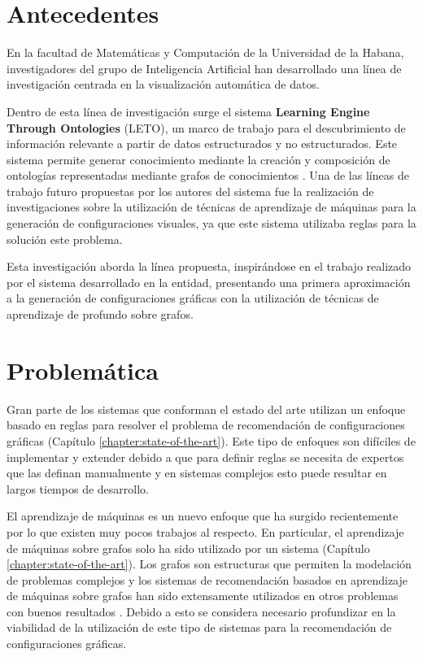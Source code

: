 \section*{Antecedentes}
En la facultad de Matem\'aticas y Computaci\'on de la Universidad de la Habana,
investigadores del grupo de Inteligencia Artificial han desarrollado una l\'inea
de investigaci\'on centrada en la visualizaci\'on autom\'atica de datos.

Dentro de esta l\'inea de investigaci\'on surge el sistema \textbf{Learning Engine
Through Ontologies} (LETO), un marco de trabajo para el descubrimiento
de informaci\'on relevante a partir de datos estructurados y no estructurados. Este
sistema permite generar conocimiento mediante la creaci\'on y composici\'on de ontolog\'ias 
representadas mediante grafos de conocimientos \cite{estevez2019demo}. Una de las l\'ineas
de trabajo futuro propuestas por los autores del sistema fue la realizaci\'on 
de investigaciones sobre la utilizaci\'on de t\'ecnicas
de aprendizaje de m\'aquinas para la generaci\'on de configuraciones visuales, ya que
este sistema utilizaba reglas para la soluci\'on este problema.

Esta investigaci\'on aborda la l\'inea propuesta, inspir\'andose en el trabajo realizado
por el sistema desarrollado en la entidad, presentando una primera aproximaci\'on a la generaci\'on 
de configuraciones gr\'aficas con la utilizaci\'on de t\'ecnicas de aprendizaje de profundo sobre grafos.


\section*{Problem\'atica}

Gran parte de los sistemas que conforman el estado del arte utilizan
un enfoque basado en reglas para resolver el problema de recomendaci\'on
de configuraciones gr\'aficas (Cap\'itulo \ref{chapter:state-of-the-art}).
Este tipo de enfoques son dif\'iciles de implementar y extender debido
a que para definir reglas se necesita de expertos que las
definan manualmente y en sistemas complejos esto puede resultar en largos
tiempos de desarrollo. 

El aprendizaje de m\'aquinas es un nuevo enfoque que ha surgido
recientemente por lo que existen muy pocos trabajos al respecto. 
En particular,
el aprendizaje de m\'aquinas sobre grafos solo ha sido utilizado por un
sistema (Cap\'itulo \ref{chapter:state-of-the-art}). 
Los grafos son estructuras que permiten la modelaci\'on
de problemas complejos y los
sistemas de recomendaci\'on basados en aprendizaje de m\'aquinas
sobre grafos han sido extensamente utilizados en otros problemas con buenos resultados \cite{guo2020survey}.
Debido a esto se considera necesario profundizar en la viabilidad de la utilizaci\'on
de este tipo de sistemas para la recomendaci\'on de configuraciones gr\'aficas.
